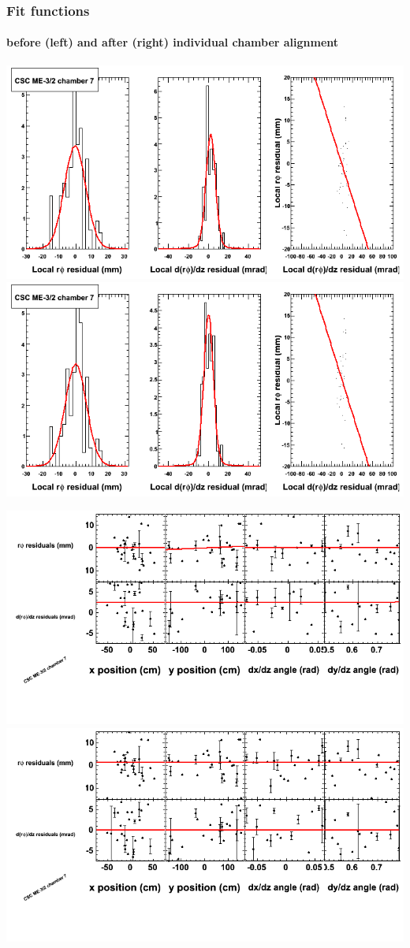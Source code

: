 \documentclass[compress]{beamer}
\begin{document}
\begin{frame}
\frametitle{Fit functions}
\framesubtitle{before (left) and after (right) individual chamber alignment}
\includegraphics[width=0.5\linewidth]{ringfits_3dof/beforefit_MEm32_07_bellcurve.png} \includegraphics[width=0.5\linewidth]{ringfits_3dof/afterfit_MEm32_07_bellcurve.png}

\includegraphics[width=0.5\linewidth]{ringfits_3dof/beforefit_MEm32_07_polynomials.png} \includegraphics[width=0.5\linewidth]{ringfits_3dof/afterfit_MEm32_07_polynomials.png}
\end{frame}
\end{document}
